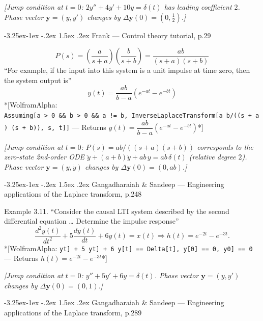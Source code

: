 \documentclass[
  11pt,
]{article}
\makeatletter
\providecommand{\implies}{\Longrightarrow}
\renewcommand\paragraph{\@startsection{paragraph}{4}{\z@}%
                                     {-3.25ex\@plus -1ex \@minus -.2ex}%
                                     {1.5ex \@plus .2ex}%
                                     {\normalfont\normalsize\bfseries}}
\makeatother
\begin{document}
\emph{{[}Jump condition at \(t=0\): \(2y''+4y'+10y=\delta(t)\) has
leading coefficient \(2\). Phase vector \(\mathbf y=(y,y')\) changes by
\(\Delta\mathbf y(0)=(0,\frac12)\).{]}}

\hypertarget{frank-control-theory-tutorial-p.29}{%
\paragraph{Frank --- Control theory tutorial,
p.29}\label{frank-control-theory-tutorial-p.29}}

\[
P(s) = \left(\frac{a}{s+a}\right)\left(\frac{b}{s+b}\right) = \frac{ab}{(s+a)(s+b)}
\] ``For example, if the input into this system is a unit impulse at
time zero, then the system output is'' \[
y(t) = \frac{ab}{b-a}\left(e^{-at} - e^{-bt}\right)
\] *{[}WolframAlpha:
\texttt{Assuming{[}a\ \textgreater{}\ 0\ \&\&\ b\ \textgreater{}\ 0\ \&\&\ a\ !=\ b,\ InverseLaplaceTransform{[}a\ b/((s\ +\ a)\ (s\ +\ b)),\ s,\ t{]}{]}}
--- Returns \(y(t) = \dfrac{ab}{b-a}\left(e^{-at} - e^{-bt}\right)\)*{]}

\emph{{[}Jump condition at \(t=0\): \(P(s)=ab/((s+a)(s+b))\) corresponds
to the zero-state 2nd-order ODE
\(\ddot y+(a+b)\dot y+ab\,y=ab\,\delta(t)\) (relative degree \(2\)).
Phase vector \(\mathbf y=(y,\dot y)\) changes by
\(\Delta\mathbf y(0)=(0,ab)\).{]}}

\hypertarget{gangadharaiah-sandeep-engineering-applications-of-the-laplace-transform-p.248}{%
\paragraph{Gangadharaiah \& Sandeep --- Engineering applications of the
Laplace transform,
p.248}\label{gangadharaiah-sandeep-engineering-applications-of-the-laplace-transform-p.248}}

Example 3.11. ``Consider the causal LTI system described by the second
differential equation \ldots{} Determine the impulse response'' \[
\frac{d^2y(t)}{dt^2} + 5\frac{dy(t)}{dt} + 6y(t) = x(t) \implies h(t) = e^{-2t} - e^{-3t}.
\] *{[}WolframAlpha:
\texttt{y\textquotesingle{}\textquotesingle{}{[}t{]}\ +\ 5\ y\textquotesingle{}{[}t{]}\ +\ 6\ y{[}t{]}\ ==\ Delta{[}t{]},\ y{[}0{]}\ ==\ 0,\ y\textquotesingle{}{[}0{]}\ ==\ 0}
--- Returns \(h(t) = e^{-2t} - e^{-3t}\)*{]}

\emph{{[}Jump condition at \(t=0\): \(y''+5y'+6y=\delta(t)\). Phase
vector \(\mathbf y=(y,y')\) changes by \(\Delta\mathbf y(0)=(0,1)\).{]}}

\hypertarget{gangadharaiah-sandeep-engineering-applications-of-the-laplace-transform-p.289}{%
\paragraph{Gangadharaiah \& Sandeep --- Engineering applications of the
Laplace transform,
p.289}\label{gangadharaiah-sandeep-engineering-applications-of-the-laplace-transform-p.289}}
\end{document}
